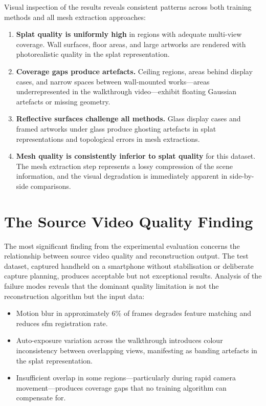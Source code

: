 Visual inspection of the results reveals consistent patterns across both training methods and all mesh extraction approaches:

\begin{enumerate}
  \item \textbf{Splat quality is uniformly high} in regions with adequate multi-view coverage. Wall surfaces, floor areas, and large artworks are rendered with photorealistic quality in the splat representation.

  \item \textbf{Coverage gaps produce artefacts.} Ceiling regions, areas behind display cases, and narrow spaces between wall-mounted works---areas underrepresented in the walkthrough video---exhibit floating Gaussian artefacts or missing geometry.

  \item \textbf{Reflective surfaces challenge all methods.} Glass display cases and framed artworks under glass produce ghosting artefacts in splat representations and topological errors in mesh extractions.

  \item \textbf{Mesh quality is consistently inferior to splat quality} for this dataset. The mesh extraction step represents a lossy compression of the scene information, and the visual degradation is immediately apparent in side-by-side comparisons.
\end{enumerate}

\section{The Source Video Quality Finding}
\label{sec:res-video-quality}

The most significant finding from the experimental evaluation concerns the relationship between source video quality and reconstruction output. The test dataset, captured handheld on a smartphone without stabilisation or deliberate capture planning, produces acceptable but not exceptional results. Analysis of the failure modes reveals that the dominant quality limitation is not the reconstruction algorithm but the input data:

\begin{itemize}
  \item Motion blur in approximately 6\% of frames degrades feature matching and reduces \acrshort{sfm} registration rate.
  \item Auto-exposure variation across the walkthrough introduces colour inconsistency between overlapping views, manifesting as banding artefacts in the splat representation.
  \item Insufficient overlap in some regions---particularly during rapid camera movement---produces coverage gaps that no training algorithm can compensate for.
\end{itemize}

